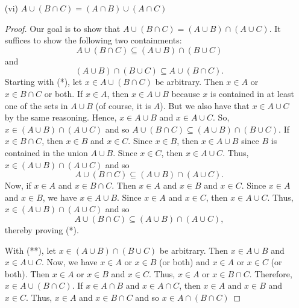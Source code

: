 \documentclass[a4paper]{article}
\begin{document}
\begin{enumerate}
\begin{proof}
        From (*) and (**), we have our desired result. 
        \end{proof}
    \item[(vi)] \( A \cup (B \cap C) = (A \cap B) \cup (A \cap C)  \)
        \begin{proof}
        Our goal is to show that \( A \cup (B \cap C) = (A \cup B) \cap (A \cup C) \). It suffices to show the following two containments:
        \[  A \cup  (B \cap C) \subseteq (A \cup B) \cap (B \cup C) \tag{*} \]
        and
        \[  (A \cup B) \cap (B \cup C) \subseteq  A \cup (B \cap C). \tag{**} \]
        Starting with (*), let \( x \in A \cup (B \cap C) \) be arbitrary. Then \( x \in A  \) or \( x \in B \cap C \) or both. If \(x \in A  \), then \( x \in A \cup B \) because \( x  \) is contained in at least one of the sets in \( A \cup B  \) (of course, it is \( A  \)). But we also have that \( x \in A \cup C  \) by the same reasoning. Hence, \( x \in A \cup B  \) and \( x \in A \cup C  \). So, \( x \in (A \cup B) \cap (A \cup C) \) and so \( A \cup (B \cap C) \subseteq (A \cup B) \cap (B \cup C)  \). If \( x \in B \cap C \), then \( x \in B  \) and \( x \in C  \). Since \( x \in B  \), then \( x \in A \cup B  \) since \( B  \) is contained in the union \( A \cup B  \). Since \( x \in C  \), then \( x \in A \cup C  \). Thus, \( x \in (A \cup B) \cap (A \cup C) \) and so 
        \[  A \cup (B \cap C) \subseteq  (A \cup B) \cap (A \cup C). \]
        Now, if \( x \in A  \) and \( x \in B \cap C \). Then \( x \in A  \) and \( x \in B  \) and \( x \in C  \). Since \( x \in A  \) and \( x \in B  \), we have \( x \in A \cup B  \). Since \( x \in A  \) and \( x \in C  \), then \( x \in A \cup C  \). Thus, \( x \in ( A \cup B) \cap (A \cup C ) \) and so 
        \[  A \cup (B \cap C) \subseteq  (A \cup B) \cap (A \cup C ), \]
        thereby proving (*).
 
        With (**), let \( x \in (A \cup B) \cap (B \cup C) \) be arbitrary. Then \( x \in A \cup B \) and \( x \in A \cup C  \). Now, we have \( x \in A  \) or \( x \in B  \) (or both) and \( x \in A  \) or \( x \in C  \) (or both). Then \( x \in A  \) or \( x \in B  \) and \( x \in C  \). Thus, \( x \in A  \) or \( x \in B \cap C  \). Therefore, \( x \in A \cup (B \cap C) \). If \( x \in A \cap B \) and \( x \in A \cap C  \), then \( x \in A  \) and \( x \in B  \) and \( x \in C  \). Thus, \( x \in A  \) and \( x \in B \cap C  \) and so \( x \in A \cap (B \cap C ) \)      
        \end{proof}
\end{enumerate}
\end{document}

